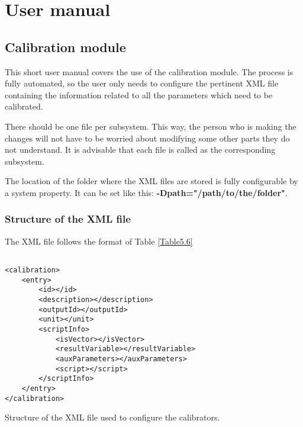 \chapter{User manual}
\section{Calibration module}
This short user manual covers the use of the calibration module. The process is fully automated, so the user only needs to configure the pertinent XML file containing the information related to all the parameters which need to be calibrated.

There should be one file per subsystem. This way, the person who is making the changes will not have to be worried about modifying some other parts they do not understand. It is advisable that each file is called as the corresponding subsystem.


The location of the folder where the XML files are stored is fully configurable by a system property. It can be set like this: \textbf{-Dpath="/path/to/the/folder"}.
\pagebreak
\subsection{Structure of the XML file}

The XML file follows the format of Table \ref{Table5.6}
\begin{table}[H]
\lstset{language=XML}
\begin{lstlisting}

<calibration>
	<entry>
		<id></id>
		<description></description>
		<outputId></outputId>
		<unit></unit>
		<scriptInfo>
			<isVector></isVector>
			<resultVariable></resultVariable>
			<auxParameters></auxParameters>
			<script></script>
		</scriptInfo>
	</entry>
</calibration>
\end{lstlisting}
\caption{Structure of the XML file used to configure the calibrators.}
\label{Table5.6}
\end{table}


